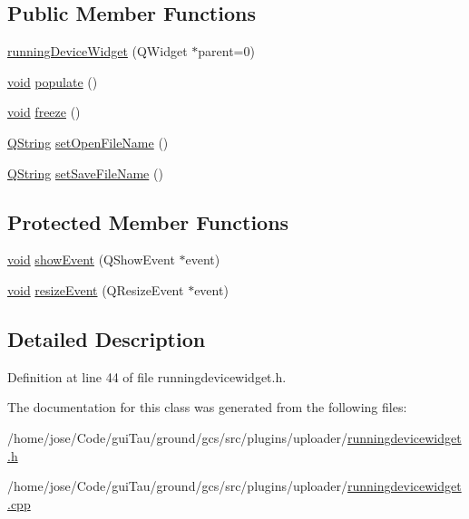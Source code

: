 \subsection*{Public Member Functions}
\begin{DoxyCompactItemize}
\item 
\hyperlink{group___y_modem_uploader_ga768545e1c1edb88b0a2b2d87b8c02202}{running\-Device\-Widget} (Q\-Widget $\ast$parent=0)
\item 
\hyperlink{group___u_a_v_objects_plugin_ga444cf2ff3f0ecbe028adce838d373f5c}{void} \hyperlink{group___uploader_ga361969437ae7c23ebaa3d646e742dbc5}{populate} ()
\item 
\hyperlink{group___u_a_v_objects_plugin_ga444cf2ff3f0ecbe028adce838d373f5c}{void} \hyperlink{group___y_modem_uploader_gabdf38e4bfbb45785ce938043aed76fc9}{freeze} ()
\item 
\hyperlink{group___u_a_v_objects_plugin_gab9d252f49c333c94a72f97ce3105a32d}{Q\-String} \hyperlink{group___y_modem_uploader_gafa1350e74a2173b31997cb6662dc4fee}{set\-Open\-File\-Name} ()
\item 
\hyperlink{group___u_a_v_objects_plugin_gab9d252f49c333c94a72f97ce3105a32d}{Q\-String} \hyperlink{group___y_modem_uploader_ga47452d9426396c22a0c0734f2c7a9f51}{set\-Save\-File\-Name} ()
\end{DoxyCompactItemize}
\subsection*{Protected Member Functions}
\begin{DoxyCompactItemize}
\item 
\hyperlink{group___u_a_v_objects_plugin_ga444cf2ff3f0ecbe028adce838d373f5c}{void} \hyperlink{group___y_modem_uploader_ga11be8942ae8b277f63d85dcb7c1449a4}{show\-Event} (Q\-Show\-Event $\ast$event)
\item 
\hyperlink{group___u_a_v_objects_plugin_ga444cf2ff3f0ecbe028adce838d373f5c}{void} \hyperlink{group___y_modem_uploader_ga66507a40f24abba397ae6ea6407a8d2c}{resize\-Event} (Q\-Resize\-Event $\ast$event)
\end{DoxyCompactItemize}


\subsection{Detailed Description}


Definition at line 44 of file runningdevicewidget.\-h.



The documentation for this class was generated from the following files\-:\begin{DoxyCompactItemize}
\item 
/home/jose/\-Code/gui\-Tau/ground/gcs/src/plugins/uploader/\hyperlink{runningdevicewidget_8h}{runningdevicewidget.\-h}\item 
/home/jose/\-Code/gui\-Tau/ground/gcs/src/plugins/uploader/\hyperlink{runningdevicewidget_8cpp}{runningdevicewidget.\-cpp}\end{DoxyCompactItemize}
